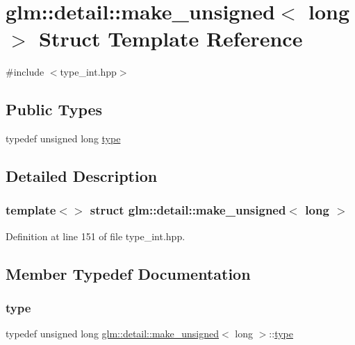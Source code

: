 \hypertarget{structglm_1_1detail_1_1make__unsigned_3_01long_01_4}{}\section{glm\+::detail\+::make\+\_\+unsigned$<$ long $>$ Struct Template Reference}
\label{structglm_1_1detail_1_1make__unsigned_3_01long_01_4}


{\ttfamily \#include $<$type\+\_\+int.\+hpp$>$}

\subsection*{Public Types}
\begin{DoxyCompactItemize}
\item 
typedef unsigned long \mbox{\hyperlink{structglm_1_1detail_1_1make__unsigned_3_01long_01_4_ade0cc74f63e30969e7d7b42eb6ac8289}{type}}
\end{DoxyCompactItemize}


\subsection{Detailed Description}
\subsubsection*{template$<$$>$\newline
struct glm\+::detail\+::make\+\_\+unsigned$<$ long $>$}



Definition at line 151 of file type\+\_\+int.\+hpp.



\subsection{Member Typedef Documentation}
\mbox{\label{structglm_1_1detail_1_1make__unsigned_3_01long_01_4_ade0cc74f63e30969e7d7b42eb6ac8289}} 
\subsubsection{\texorpdfstring{type}{type}}
{\footnotesize\ttfamily typedef unsigned long \mbox{\hyperlink{structglm_1_1detail_1_1make__unsigned}{glm\+::detail\+::make\+\_\+unsigned}}$<$ long $>$\+::\mbox{\hyperlink{structglm_1_1detail_1_1make__unsigned_3_01long_01_4_ade0cc74f63e30969e7d7b42eb6ac8289}{type}}}




